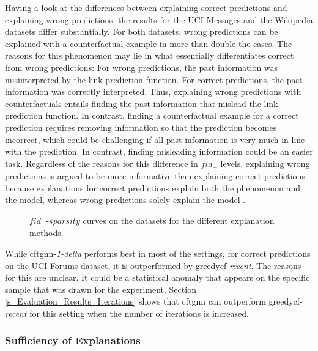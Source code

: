 Having a look at the differences between explaining correct predictions and explaining wrong predictions, the results for the UCI-Messages and the Wikipedia datasets differ substantially. For both datasets, wrong predictions can be explained with a counterfactual example in more than double the cases. The reasons for this phenomenon may lie in what essentially differentiates correct from wrong predictions: For wrong predictions, the past information was misinterpreted by the link prediction function. For correct predictions, the past information was correctly interpreted. Thus, explaining wrong predictions with counterfactuals entails finding the past information that mislead the link prediction function. In contrast, finding a counterfactual example for a correct prediction requires removing information so that the prediction becomes incorrect, which could be challenging if all past information is very much in line with the prediction. In contrast, finding misleading information could be an easier task. Regardless of the reasons for this difference in $fid_+$ levels, explaining wrong predictions is argued to be more informative than explaining correct predictions because explanations for correct predictions explain both the phenomenon and the model, whereas wrong predictions solely explain the model \cite{amara_graphframex_2022}.

\begin{figure}[ht]
    \centering
    
    \caption{$fid_+$-$sparsity$ curves on the datasets for the different explanation methods.}
    \label{f_fid_spar}
\end{figure}

While \gls{cftgnn}-\textit{1-delta} performs best in most of the settings, for correct predictions on the UCI-Forums dataset, it is outperformed by \gls{greedycf}-\textit{recent}. The reasons for this are unclear. It could be a statistical anomaly that appears on the specific sample that was drawn for the experiment. Section \ref{s_Evaluation_Results_Iterations} shows that \gls{cftgnn} can outperform \gls{greedycf}-\textit{recent} for this setting when the number of iterations is increased.


\FloatBarrier

\subsubsection{Sufficiency of Explanations}
\label{s_Evaluation_Results_Sufficiency}

